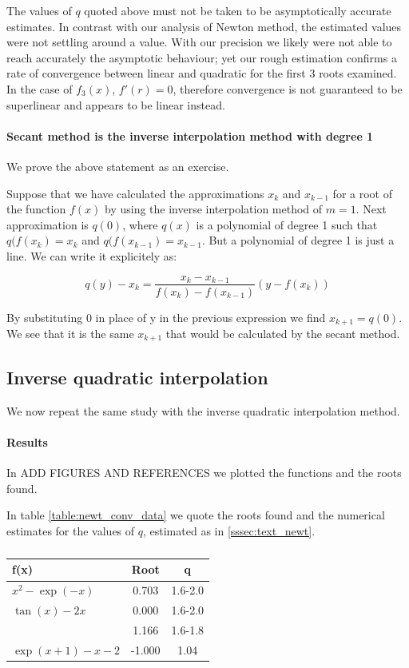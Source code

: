 \documentclass[a4paper,11]{article}
\begin{document}
The values of $q$ quoted above must not be taken to be asymptotically accurate
estimates. In contrast with our analysis of Newton method, the estimated values
were not settling around a value. With our precision we likely were not able
to reach accurately the asymptotic behaviour; yet our rough estimation confirms 
a rate of convergence between linear and quadratic for the first 3 roots 
examined. In the case of $f_{3}(x)$, $f'(r) = 0$, therefore convergence is 
not guaranteed to be superlinear and appears to be linear instead.

\paragraph{Secant method is the inverse interpolation method with degree 1}

We prove the above statement as an exercise.

Suppose that we have calculated the approximations $x_{k}$ and $x_{k-1}$
for a root of the function $f(x)$ by using
the inverse interpolation method of $m = 1$. Next approximation is $q(0)$,
where $q(x)$ is a polynomial of degree 1 such that $q(f(x_{k}) = x_{k}$ and
$q(f(x_{k-1}) = x_{k-1}$. But a polynomial of degree 1 is just a line. We can 
write it explicitely as:

\[
	q(y) - x_{k} = \frac{x_{k}-x_{k-1}}{f(x_{k})-f(x_{k-1})}(y - f(x_{k}))
\]

By substituting 0 in place of y in the previous expression we find 
$x_{k+1} = q(0)$. We see that it is the same $x_{k+1}$ that would be 
calculated by the secant method.

\subsection{Inverse quadratic interpolation}

We now repeat the same study with the inverse quadratic interpolation
method.

\paragraph{Results}

In ADD FIGURES AND REFERENCES we plotted the functions and the roots found.

In table \ref{table:newt_conv_data} we quote the roots found and the numerical 
estimates for the values of $q$, estimated as in \ref{sssec:text_newt}.


\begin{table}[ht]
	\centering
	\begin{tabular}{l|c|c}
		f(x) & Root & \approx q\\
		\hline
		$x^{2} - \exp(-x)$    & 0.703  & 1.6-2.0\\
		$\tan(x) - 2x$        & 0.000  & 1.6-2.0\\
		                      & 1.166  & 1.6-1.8\\
		$\exp(x + 1) - x - 2$ & -1.000 & 1.04
	\end{tabular}
	\caption{}
	\label{table:sec_conv_data}
\end{table}
\end{document}
